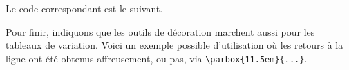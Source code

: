 \documentclass[12pt,a4paper]{article}
\begin{document}
Le code correspondant est le suivant.

\medskip





 \label{tnsana-graphsign-com-two-lines}

Pour finir, indiquons que les outils de décoration marchent aussi pour les tableaux de variation.
Voici un exemple possible d'utilisation où les retours à la ligne ont été obtenus affreusement, ou pas, via \verb#\parbox{11.5em}{...}#.

\begin{center}
	
\end{center}
\end{document}
